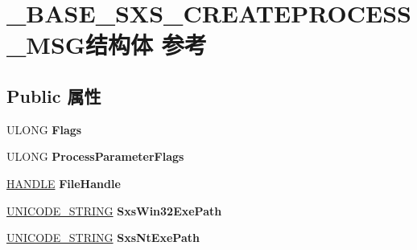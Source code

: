 \hypertarget{struct___b_a_s_e___s_x_s___c_r_e_a_t_e_p_r_o_c_e_s_s___m_s_g}{}\section{\+\_\+\+B\+A\+S\+E\+\_\+\+S\+X\+S\+\_\+\+C\+R\+E\+A\+T\+E\+P\+R\+O\+C\+E\+S\+S\+\_\+\+M\+S\+G结构体 参考}
\label{struct___b_a_s_e___s_x_s___c_r_e_a_t_e_p_r_o_c_e_s_s___m_s_g}
\subsection*{Public 属性}
\begin{DoxyCompactItemize}
\item 
\mbox{\label{struct___b_a_s_e___s_x_s___c_r_e_a_t_e_p_r_o_c_e_s_s___m_s_g_a32130761ca11d85e56601befb4685e0d}} 
U\+L\+O\+NG {\bfseries Flags}
\item 
\mbox{\label{struct___b_a_s_e___s_x_s___c_r_e_a_t_e_p_r_o_c_e_s_s___m_s_g_aed11259ccc043a05cdc8abdc0897c0dd}} 
U\+L\+O\+NG {\bfseries Process\+Parameter\+Flags}
\item 
\mbox{\label{struct___b_a_s_e___s_x_s___c_r_e_a_t_e_p_r_o_c_e_s_s___m_s_g_a42f3cb3b05e866ddf53084b62af33f23}} 
\hyperlink{interfacevoid}{H\+A\+N\+D\+LE} {\bfseries File\+Handle}
\item 
\mbox{\label{struct___b_a_s_e___s_x_s___c_r_e_a_t_e_p_r_o_c_e_s_s___m_s_g_a09c80a6f9f6e71d2b89f7c80e25a125e}} 
\hyperlink{struct___u_n_i_c_o_d_e___s_t_r_i_n_g}{U\+N\+I\+C\+O\+D\+E\+\_\+\+S\+T\+R\+I\+NG} {\bfseries Sxs\+Win32\+Exe\+Path}
\item 
\mbox{\label{struct___b_a_s_e___s_x_s___c_r_e_a_t_e_p_r_o_c_e_s_s___m_s_g_ad7d846771325df516384b18637d17bff}} 
\hyperlink{struct___u_n_i_c_o_d_e___s_t_r_i_n_g}{U\+N\+I\+C\+O\+D\+E\+\_\+\+S\+T\+R\+I\+NG} {\bfseries Sxs\+Nt\+Exe\+Path}
\item 

\end{DoxyCompactItemize}
